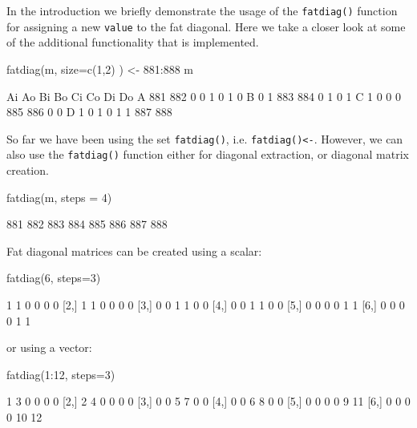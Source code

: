 \documentclass[article]{jss}
\begin{document}
In the introduction we briefly demonstrate the usage of the
\texttt{fatdiag()} function for assigning a new \texttt{value} to the
fat diagonal. Here we take a closer look at some of the additional
functionality that is implemented.

\begin{CodeChunk}
\begin{CodeInput}
fatdiag(m, size=c(1,2) ) <- 881:888
m
\end{CodeInput}
\begin{CodeOutput}
   Ai  Ao  Bi  Bo  Ci  Co  Di  Do
A 881 882   0   0   1   0   1   0
B   0   1 883 884   0   1   0   1
C   1   0   0   0 885 886   0   0
D   1   0   1   0   1   1 887 888
\end{CodeOutput}
\end{CodeChunk}

So far we have been using the set \texttt{fatdiag()}, i.e.
\texttt{fatdiag()\textless{}-}. However, we can also use the
\texttt{fatdiag()} function either for diagonal extraction, or diagonal
matrix creation.

\begin{CodeChunk}
\begin{CodeInput}
fatdiag(m, steps = 4)
\end{CodeInput}
\begin{CodeOutput}
[1] 881 882 883 884 885 886 887 888
\end{CodeOutput}
\end{CodeChunk}

Fat diagonal matrices can be created using a scalar:

\begin{CodeChunk}
\begin{CodeInput}
fatdiag(6, steps=3)
\end{CodeInput}
\begin{CodeOutput}
     [,1] [,2] [,3] [,4] [,5] [,6]
[1,]    1    1    0    0    0    0
[2,]    1    1    0    0    0    0
[3,]    0    0    1    1    0    0
[4,]    0    0    1    1    0    0
[5,]    0    0    0    0    1    1
[6,]    0    0    0    0    1    1
\end{CodeOutput}
\end{CodeChunk}

or using a vector:

\begin{CodeChunk}
\begin{CodeInput}
fatdiag(1:12, steps=3)
\end{CodeInput}
\begin{CodeOutput}
     [,1] [,2] [,3] [,4] [,5] [,6]
[1,]    1    3    0    0    0    0
[2,]    2    4    0    0    0    0
[3,]    0    0    5    7    0    0
[4,]    0    0    6    8    0    0
[5,]    0    0    0    0    9   11
[6,]    0    0    0    0   10   12
\end{CodeOutput}
\end{CodeChunk}
\end{document}
